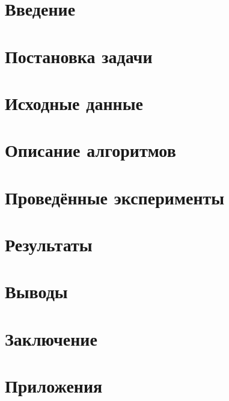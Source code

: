 \documentclass[a4paper,12pt]{article}
\begin{document}


\tableofcontents
\newpage

\section{ Введение }

\section{ Постановка задачи }

\section{ Исходные данные }

\section{ Описание алгоритмов }

\section{ Проведённые эксперименты }

\section{ Результаты }

\section{ Выводы }

\section{ Заключение }


\newpage
{}
\printbibliography[title={Список использованных источников}]

\newpage
\section{ Приложения }

\end{document}
